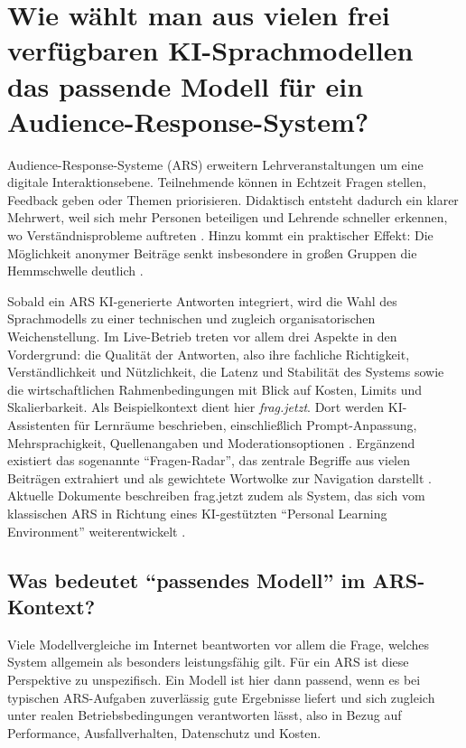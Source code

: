 
\section{Wie wählt man aus vielen frei verfügbaren KI-Sprachmodellen das passende Modell für ein Audience-Response-System?}

Audience-Response-Systeme (ARS) erweitern Lehrveranstaltungen um eine digitale Interaktionsebene. Teilnehmende können in Echtzeit Fragen stellen, Feedback geben oder Themen priorisieren. Didaktisch entsteht dadurch ein klarer Mehrwert, weil sich mehr Personen beteiligen und Lehrende schneller erkennen, wo Verständnisprobleme auftreten \parencite{hsworms-ars}. Hinzu kommt ein praktischer Effekt: Die Möglichkeit anonymer Beiträge senkt insbesondere in großen Gruppen die Hemmschwelle deutlich \parencite{fragjetzt-analyse}.

Sobald ein ARS KI-generierte Antworten integriert, wird die Wahl des Sprachmodells zu einer technischen und zugleich organisatorischen Weichenstellung. Im Live-Betrieb treten vor allem drei Aspekte in den Vordergrund: die Qualität der Antworten, also ihre fachliche Richtigkeit, Verständlichkeit und Nützlichkeit, die Latenz und Stabilität des Systems sowie die wirtschaftlichen Rahmenbedingungen mit Blick auf Kosten, Limits und Skalierbarkeit. Als Beispielkontext dient hier \emph{frag.jetzt}. Dort werden KI-Assistenten für Lernräume beschrieben, einschließlich Prompt-Anpassung, Mehrsprachigkeit, Quellenangaben und Moderationsoptionen \parencite{fragjetzt-site}. Ergänzend existiert das sogenannte \enquote{Fragen-Radar}, das zentrale Begriffe aus vielen Beiträgen extrahiert und als gewichtete Wortwolke zur Navigation darstellt \parencite{educa-fragjetzt,fragjetzt-analyse}. Aktuelle Dokumente beschreiben frag.jetzt zudem als System, das sich vom klassischen ARS in Richtung eines KI-gestützten \enquote{Personal Learning Environment} weiterentwickelt \parencite{fragjetzt-handout,fragjetzt-analyse}.

\subsection{Was bedeutet \enquote{passendes Modell} im ARS-Kontext?}

Viele Modellvergleiche im Internet beantworten vor allem die Frage, welches System allgemein als besonders leistungsfähig gilt. Für ein ARS ist diese Perspektive zu unspezifisch. Ein Modell ist hier dann passend, wenn es bei typischen ARS-Aufgaben zuverlässig gute Ergebnisse liefert und sich zugleich unter realen Betriebsbedingungen verantworten lässt, also in Bezug auf Performance, Ausfallverhalten, Datenschutz und Kosten.

